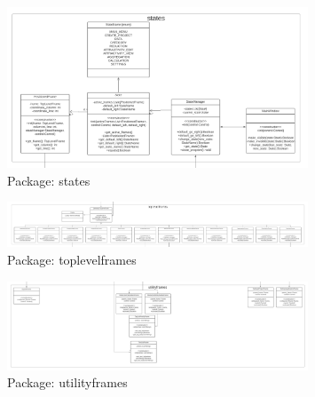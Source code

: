 \documentclass[letterpaper,10pt,english]{sphinxmanual}
\begin{document}
\hypertarget{states}{
\begin{figure}[hbt!]
  \centering
\includegraphics[width=0.8\textwidth]
        {pictures/states.png}
  \caption{Package: states}
  \label{fig:states}
\end{figure}
}

\hypertarget{toplevelframes}{
\begin{figure}[hbt!]
  \centering
\includegraphics[width=0.8\textwidth]
        {pictures/toplevelframes.png}
  \caption{Package: toplevelframes}
  \label{fig:toplevelframes}
\end{figure}
}

\hypertarget{utilityframes}{
\begin{figure}[hbt!]
  \centering
\includegraphics[width=0.8\textwidth]
        {pictures/utilityframes.png}
  \caption{Package: utilityframes}
  \label{fig:utilityframes}
\end{figure}
}
\end{document}
